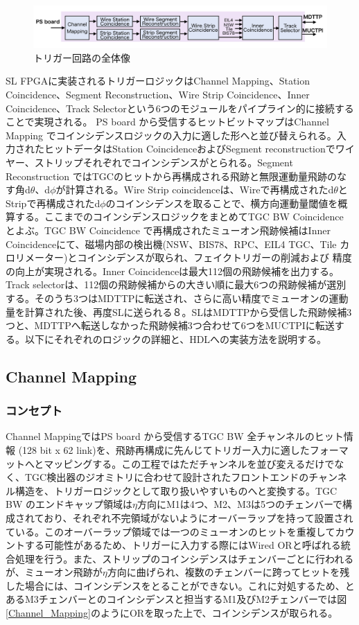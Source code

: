 \begin{figure} 
\centering
\includegraphics[width=16cm]{fig/SL/Trigger_over.png}
\caption[トリガー回路の全体像]{トリガー回路の全体像}
\label{Trigger_over}
\end{figure}

SL FPGAに実装されるトリガーロジックはChannel Mapping、Station Coincidence、Segment Reconstruction、Wire Strip Coincidence、Inner Coincidence、Track Selectorという6つのモジュールをパイプライン的に接続することで実現される。
PS board から受信するヒットビットマップはChannel Mapping でコインシデンスロジックの入力に適した形へと並び替えられる。入力されたヒットデータはStation CoincidenceおよびSegment reconstructionでワイヤー、ストリップそれぞれでコインシデンスがとられる。Segment Reconstruction ではTGCのヒットから再構成される飛跡と無限運動量飛跡のなす角d$\theta$、d$\phi$が計算される。Wire Strip coincidenceは、Wireで再構成されたd$\theta$とStripで再構成されたd$\phi$のコインシデンスを取ることで、横方向運動量閾値\pt を概算する。ここまでのコインシデンスロジックをまとめてTGC BW Coincidence とよぶ。TGC BW Coincidence で再構成されたミューオン飛跡候補はInner Coincidenceにて、磁場内部の検出機(NSW、BIS78、RPC、EIL4 TGC、Tile カロリメーター)とコインシデンスが取られ、フェイクトリガーの削減および \pt 精度の向上が実現される。Inner Coincidenceは最大112個の飛跡候補を出力する。Track selectorは、112個の飛跡候補から\pt の大きい順に最大6つの飛跡候補が選別する。そのうち3つはMDTTPに転送され、さらに高い精度でミューオンの運動量を計算された後、再度SLに送られる８。SLはMDTTPから受信した飛跡候補3つと、MDTTPへ転送しなかった飛跡候補3つ合わせて6つをMUCTPIに転送する。以下にそれぞれのロジックの詳細と、HDLへの実装方法を説明する。

\subsection{Channel Mapping}
\subsubsection*{コンセプト}
Channel MappingではPS board から受信するTGC BW 全チャンネルのヒット情報 (128 bit x 62 link)を、飛跡再構成に先んじてトリガー入力に適したフォーマットへとマッピングする。この工程ではただチャンネルを並び変えるだけでなく、TGC検出器のジオミトリに合わせて設計されたフロントエンドのチャンネル構造を、トリガーロジックとして取り扱いやすいものへと変換する。TGC BW のエンドキャップ領域は$\eta$方向にM1は4つ、M2、M3は5つのチェンバーで構成されており、それぞれ不完領域がないようにオーバーラップを持って設置されている。このオーバーラップ領域では一つのミューオンのヒットを重複してカウントする可能性があるため、トリガーに入力する際にはWired ORと呼ばれる統合処理を行う。また、ストリップのコインシデンスはチェンバーごとに行われるが、ミューオン飛跡が$\eta$方向に曲げられ、複数のチェンバーに跨ってヒットを残した場合には、コインシデンスをとることができない。これに対処するため、とあるM3チェンバーとのコインシデンスと担当するM1及びM2チェンバーでは図\ref{Channel_Mapping}のようにORを取った上で、コインシデンスが取られる。


